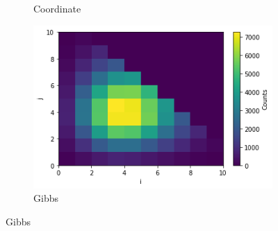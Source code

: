 \begin{figure}[H]
\begin{subfigure}{.5\textwidth}
  \caption{Coordinate}
\end{subfigure}%
\begin{subfigure}{.5\textwidth}
  \centering
  \includegraphics[width=.8\linewidth]{figures/simplesen.png}
  \caption{Gibbs}
\end{subfigure}
\end{figure}




